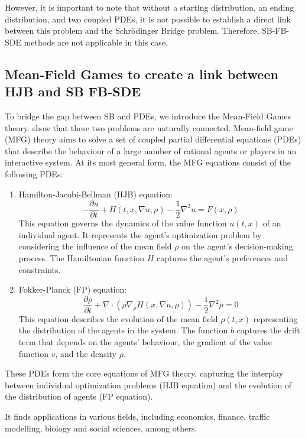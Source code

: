 \documentclass{article}
\begin{document}
However, it is important to note that without a starting distribution, an ending distribution, and two coupled PDEs, it is not possible to establish a direct link between this problem and the Schrödinger Bridge problem. Therefore, SB-FB-SDE methods are not applicable in this case.



\subsection{Mean-Field Games to create a link between HJB and SB FB-SDE}

To bridge the gap between SB and PDEs, we introduce the Mean-Field Games theory.
\cite{caluya2021wasserstein} show that these two problems are naturally connected.
Mean-field game (MFG) theory aims to solve a set of coupled partial differential equations (PDEs) that describe the behaviour of a large number of rational agents or players in an interactive system.
At its most general form, the MFG equations consist of the following PDEs:
\begin{enumerate}
\item Hamilton-Jacobi-Bellman (HJB) equation:
\[
-\frac{\partial u}{\partial t} + H(t, x, \nabla u, \rho) - \frac{1}{2}\nabla^2 u = F(x, \rho)
\]
This equation governs the dynamics of the value function \(u(t, x)\) of an individual agent. It represents the agent's optimization problem by considering the influence of the mean field \(\rho\) on the agent's decision-making process. The Hamiltonian function \(H\) captures the agent's preferences and constraints.

\item Fokker-Planck (FP) equation:
\[
\frac{\partial \rho}{\partial t} + \nabla \cdot (\rho \nabla_\rho H(x, \nabla u, \rho))- \frac{1}{2}\nabla^2 \rho= 0
\]
This equation describes the evolution of the mean field \(\rho(t, x)\) representing the distribution of the agents in the system. The function \(b\) captures the drift term that depends on the agents' behaviour, the gradient of the value function \(v\), and the density \(\rho\).
\end{enumerate}

These PDEs form the core equations of MFG theory, capturing the interplay between individual optimization problems (HJB equation) and the evolution of the distribution of agents (FP equation).

It finds applications in various fields, including economics, finance, traffic modelling, biology and social sciences, among others.
\end{document}

